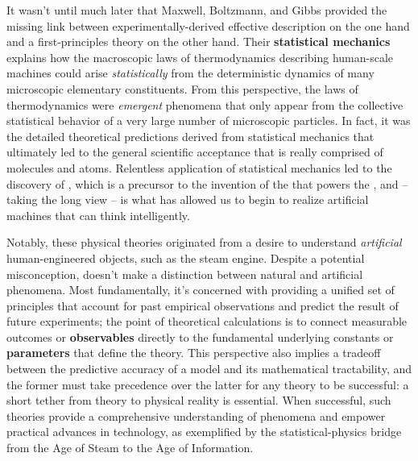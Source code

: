 It wasn't until much later that Maxwell, Boltzmann, and Gibbs provided the missing link between experimentally-derived effective description on the one hand and a first-principles theory on the other hand.
Their \textbf{statistical mechanics} explains how the macroscopic laws of thermodynamics describing human-scale machines could arise \emph{statistically} from the deterministic dynamics of many microscopic elementary constituents. 
From this perspective, the laws of thermodynamics were \emph{emergent} phenomena that only appear from the collective statistical behavior of a very large number of microscopic particles.
In fact, it was the detailed theoretical predictions derived from statistical mechanics that ultimately led to the general scientific acceptance 
that  is really comprised of molecules and atoms.
Relentless application of statistical mechanics
led to the discovery of , which 
is a precursor to the
invention of the  that powers the , and 
-- taking the long view -- 
is what has allowed us to 
begin to 
realize artificial machines that can 
think %
intelligently.








Notably, these physical theories originated from a desire to understand \emph{artificial} human-engineered objects, such as the steam engine. Despite a 
potential %
misconception,   doesn't make a distinction between natural and artificial phenomena. Most fundamentally, it's concerned with providing a unified set of principles that account for past empirical observations and predict the result of future experiments; the point of theoretical calculations is to connect measurable outcomes or \textbf{observables} directly to the fundamental underlying constants or \textbf{parameters} that define the theory. This perspective also implies a tradeoff between the predictive 
accuracy
of a model and its mathematical tractability, and the former must take precedence over the latter 
for any theory 
to be successful:  a short tether from theory to physical reality is essential.
When successful, such theories provide a comprehensive understanding of phenomena and empower practical advances in technology, as exemplified by the statistical-physics bridge from the Age of Steam to the Age of Information.






